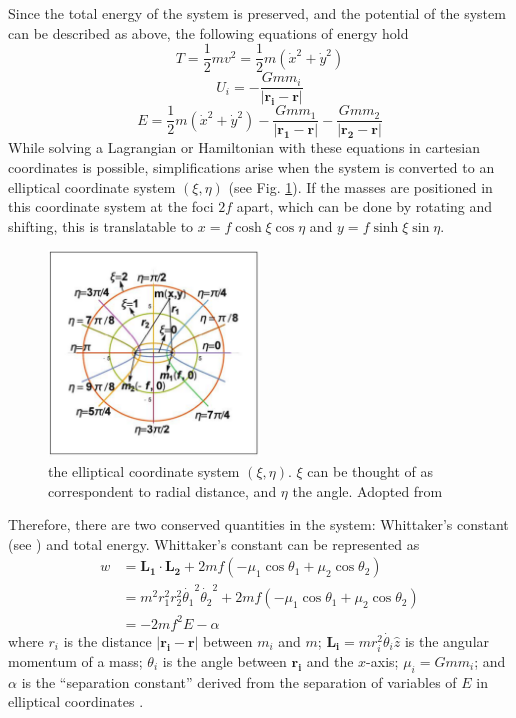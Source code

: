 \documentclass[preprint,titlepage,preprintnumbers,amsmath,amssymb,aps,11pt]{revtex4-2}
\begin{document}
Since the total energy of the system is preserved, and the potential of the system can be described as above, the following equations of energy hold
\begin{equation}
    T=\frac{1}{2}mv^2=\frac{1}{2}m(\dot{x}^2 + \dot{y}^2)
\end{equation}
\begin{equation}
    U_i=-\frac{Gmm_i}{|\bm{r_i}-\bm{r}|}
\end{equation}
\begin{equation}
    E=\frac{1}{2}m(\dot{x}^2 + \dot{y}^2)-\frac{Gmm_1}{|\bm{r_1}-\bm{r}|}-\frac{Gmm_2}{|\bm{r_2}-\bm{r}|}
\end{equation}
While solving a Lagrangian or Hamiltonian with these equations in cartesian coordinates is possible, simplifications arise when the system is converted to an elliptical coordinate system $(\xi,\eta)$ (see Fig. \ref{fig:coordinatesys}). If the masses are positioned in this coordinate system at the foci $2f$ apart, which can be done by rotating and shifting, this is translatable to $x=f\cosh{\xi}\cos{\eta}$ and $y=f\sinh{\xi}\sin{\eta}$.
\begin{figure}
    \centering
    \includegraphics[width=0.5\textwidth]{Fig 2.png}
    \caption{the elliptical coordinate system $(\xi,\eta)$. $\xi$ can be thought of as correspondent to radial distance, and $\eta$ the angle. Adopted from \cite{Krishnaswami2019}}
    \label{fig:coordinatesys}
\end{figure}

Therefore, there are two conserved quantities in the system: Whittaker's constant (see \cite[p. 100]{Krishnaswami2019}) and total energy. Whittaker's constant can be represented as
\begin{equation}
    \begin{aligned}
        w & =\bm{L_1}\cdot\bm{L_2}+2mf(-\mu _1 \cos{\theta _1} +\mu _2 \cos{\theta _2})                           \\
          & =m^2r_1^2r_2^2\dot{\theta _1}^2\dot{\theta _2}^2+2mf(-\mu _1 \cos{\theta _1} +\mu _2 \cos{\theta _2}) \\
          & =-2mf^2E-\alpha
    \end{aligned}
\end{equation}
where $r_i$ is the distance $|\bm{r_i}-\bm{r}|$ between $m_i$ and $m$; $\bm{L_i}=mr_i^2\dot{\theta _i}\hat{z}$ is the angular momentum of a mass; $\theta _i$ is the angle between $\bm{r_i}$ and the $x$-axis; $\mu _i=Gmm_i$; and $\alpha$ is the “separation constant” derived from the separation of variables of $E$ in elliptical coordinates \cite[p. 101]{Krishnaswami2019}.
\end{document}
